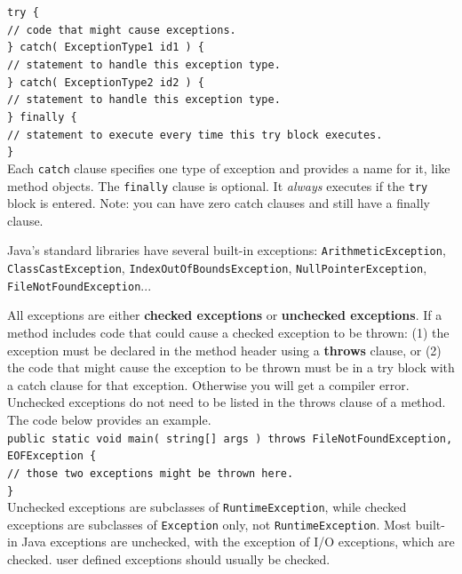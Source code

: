 \texttt{try \{} \\
\indent \indent \texttt{// code that might cause exceptions.} \\
\indent \texttt{\} catch( ExceptionType1 id1 ) \{} \\
\indent \indent \texttt{// statement to handle this exception type.} \\
\indent \texttt{\} catch( ExceptionType2 id2 ) \{} \\
\indent \indent \texttt{// statement to handle this exception type.} \\
\indent \texttt{\} finally \{} \\
\indent \indent \texttt{// statement to execute every time this try block executes.} \\
\indent \texttt{\}} \\

Each \texttt{catch} clause specifies one type of exception and provides a name for it, like method objects. The \texttt{finally} clause is optional. It \textit{always} executes if the \texttt{try} block is entered. Note: you can have zero catch clauses and still have a finally clause. 

Java's standard libraries have several built-in exceptions: \texttt{ArithmeticException}, \texttt{ClassCastException}, \texttt{IndexOutOfBoundsException}, \texttt{NullPointerException}, \texttt{FileNotFoundException}...

All exceptions are either \textbf{checked exceptions} or \textbf{unchecked exceptions}. If a method includes code that could cause a checked exception to be thrown: (1) the exception must be declared in the method header using a \textbf{throws} clause, or (2) the code that might cause the exception to be thrown must be in a try block with a catch clause for that exception. Otherwise you will get a compiler error. Unchecked exceptions do not need to be listed in the throws clause of a method. The code below provides an example. \\

\texttt{public static void main( string[] args ) throws FileNotFoundException, EOFException \{} \\
\indent \indent \texttt{// those two exceptions might be thrown here.} \\
\indent \texttt{\}} \\

Unchecked exceptions are subclasses of \texttt{RuntimeException}, while checked exceptions are subclasses of \texttt{Exception} only, not \texttt{RuntimeException}. Most built-in Java exceptions are unchecked, with the exception of I/O exceptions, which are checked. user defined exceptions should usually be checked. 

